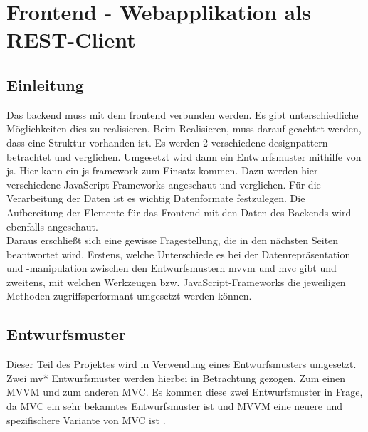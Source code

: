 
\section{Frontend - Webapplikation als REST-Client}
\subsection{Einleitung}
Das \Gls{backend} muss mit dem \Gls{frontend} verbunden werden. Es gibt unterschiedliche Möglichkeiten dies zu realisieren. Beim Realisieren, muss darauf geachtet werden, dass eine Struktur vorhanden ist. Es werden 2 verschiedene \Gls{designpattern} betrachtet und verglichen. Umgesetzt wird dann ein Entwurfsmuster mithilfe von \Gls{js}. Hier kann ein \Gls{js}-\Gls{framework} zum Einsatz kommen. Dazu werden hier verschiedene JavaScript-Frameworks angeschaut und verglichen. Für die Verarbeitung der Daten ist es wichtig Datenformate festzulegen. Die Aufbereitung der Elemente für das Frontend mit den Daten des Backends wird ebenfalls angeschaut.
\\
Daraus erschließt sich eine gewisse Fragestellung, die in den nächsten Seiten beantwortet wird. Erstens, welche Unterschiede es bei der Datenrepräsentation und -manipulation zwischen den Entwurfsmustern \Gls{mvvm} und \Gls{mvc} gibt und zweitens, mit welchen Werkzeugen bzw. JavaScript-Frameworks die jeweiligen Methoden zugriffsperformant umgesetzt werden können.
\subsection{Entwurfsmuster}
Dieser Teil des Projektes wird in Verwendung eines Entwurfsmusters umgesetzt. Zwei \Gls{mv*} Entwurfsmuster werden hierbei in Betrachtung gezogen. Zum einen MVVM und zum anderen MVC. Es kommen diese zwei Entwurfsmuster in Frage, da MVC ein sehr bekanntes Entwurfsmuster ist und MVVM eine neuere und spezifischere Variante von MVC ist \cite{mvvm_vue}.
